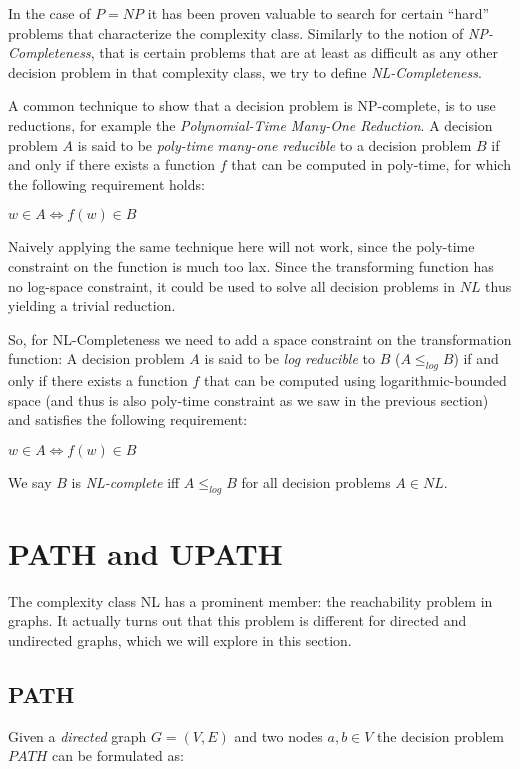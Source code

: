 In the case of $P = NP$ it has been proven valuable to search for
certain ``hard'' problems that characterize the complexity class.
Similarly to the notion of \emph{NP-Completeness}, that is certain
problems that are at least as difficult as any other decision problem in
that complexity class, we try to define \emph{NL-Completeness}.

A common technique to show that a decision problem is NP-complete, is to
use reductions, for example the \emph{Polynomial-Time Many-One
Reduction}. A decision problem $A$ is said to be \emph{poly-time
many-one reducible} to a decision problem $B$ if and only if there
exists a function $f$ that can be computed in poly-time, for which the
following requirement holds:

$w \in A \Leftrightarrow f(w) \in B$

Naively applying the same technique here will not work, since the
poly-time constraint on the function is much too lax. Since the
transforming function has no log-space constraint, it could be used to
solve all decision problems in $NL$ thus yielding a trivial reduction.

So, for NL-Completeness we need to add a space constraint on the
transformation function: A decision problem $A$ is said to be \emph{log
reducible} to $B$ ($A \leq_{log} B$) if and only if there exists a
function $f$ that can be computed using logarithmic-bounded space (and
thus is also poly-time constraint as we saw in the previous section) and
satisfies the following requirement:

$w \in A \Leftrightarrow f(w) \in B$

We say $B$ is \emph{NL-complete} iff $A \leq_{log} B$ for all decision
problems $A \in NL$.

\chapter{PATH and UPATH}\label{path-and-upath}

The complexity class NL has a prominent member: the reachability problem
in graphs. It actually turns out that this problem is different for
directed and undirected graphs, which we will explore in this section.

\section{PATH}\label{path}

Given a \emph{directed} graph $G = (V, E)$ and two nodes $a, b \in V$
the decision problem $PATH$ can be formulated as:

